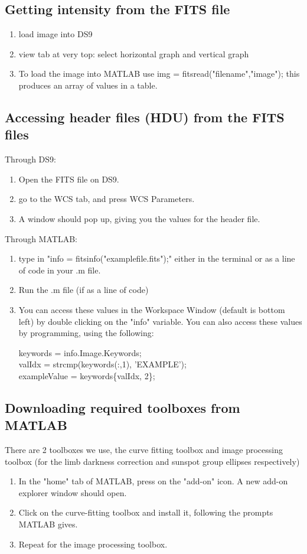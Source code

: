 \documentclass[a4paper]{article}
\begin{document}
\subsection{Getting intensity from the FITS file}
\begin{enumerate}
    \item load image into DS9
    \item view tab at very top: select horizontal graph and vertical graph
    \item To load the image into MATLAB use img = fitsread("filename","image"); this produces an array of values in a table.
\end{enumerate}


\subsection{Accessing header files (HDU) from the FITS files}
Through DS9:
\begin{enumerate}
    \item Open the FITS file on DS9.
    \item go to the WCS tab, and press WCS Parameters.
    \item A window should pop up, giving you the values for the header file.
\end{enumerate}
Through MATLAB:
\begin{enumerate}
    \item type in "info = fitsinfo("examplefile.fits");" either in the terminal or as a line of code in your .m file.
    \item Run the .m file (if as a line of code)
    \item You can access these values in the Workspace Window (default is bottom left) by double clicking on the "info" variable.
    You can also access these values by programming, using the following: \newline
    {\centering keywords = info.Image.Keywords; \\
    valIdx = strcmp(keywords(:,1), 'EXAMPLE'); \\
    exampleValue = keywords\{valIdx, 2\};
    \par}
\end{enumerate}


\subsection{Downloading required toolboxes from MATLAB}
There are 2 toolboxes we use, the curve fitting toolbox and image processing toolbox (for the limb darkness correction and sunspot group ellipses respectively)
\begin{enumerate}
    \item In the "home" tab of MATLAB, press on the "add-on" icon. A new add-on explorer window should open.
    \item Click on the curve-fitting toolbox and install it, following the prompts MATLAB gives.
    \item Repeat for the image processing toolbox.
\end{enumerate}
\end{document}
